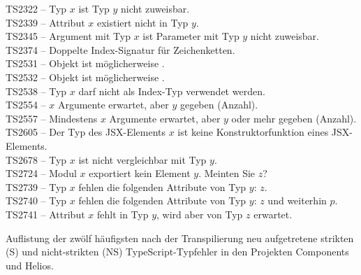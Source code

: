 \begin{table}[p]
{    TS2322 -- Typ $x$ ist Typ $y$ nicht zuweisbar.\\
    TS2339 -- Attribut $x$ existiert nicht in Typ $y$.\\
    TS2345 -- Argument mit Typ $x$ ist Parameter mit Typ $y$ nicht zuweisbar.\\
    TS2374 -- Doppelte Index-Signatur für Zeichenketten.\\
    TS2531 -- Objekt ist möglicherweise .\\
    TS2532 -- Objekt ist möglicherweise .\\
    TS2538 -- Typ $x$ darf nicht als Index-Typ verwendet werden.\\
    TS2554 -- $x$ Argumente erwartet, aber $y$ gegeben (Anzahl).\\
    TS2557 -- Mindestens $x$ Argumente erwartet, aber $y$ oder mehr gegeben (Anzahl).\\
    TS2605 -- Der Typ des JSX-Elements $x$ ist keine Konstruktorfunktion eines JSX-Elements.\\
    TS2678 -- Typ $x$ ist nicht vergleichbar mit Typ $y$.\\
    TS2724 -- Modul $x$ exportiert kein Element $y$. Meinten Sie $z$?\\
    TS2739 -- Typ $x$ fehlen die folgenden Attribute von Typ $y$: $z$.\\
    TS2740 -- Typ $x$ fehlen die folgenden Attribute von Typ $y$: $z$ und weiterhin $p$.\\
    TS2741 -- Attribut $x$ fehlt in Typ $y$, wird aber von Typ $z$ erwartet.\\
  }
  \vspace{\baselineskip}
  \caption{Auflistung der zwölf häufigsten nach der Transpilierung neu aufgetretene strikten (S) und nicht-strikten (NS) TypeScript-Typfehler in den Projekten Components und Helios.}
  \label{tab:type-errors}
\end{table}
